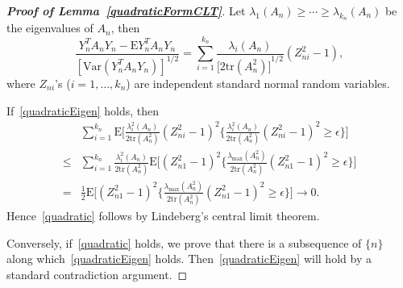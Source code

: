 \documentclass[review]{elsarticle}
\theoremstyle{plain}
\theoremstyle{definition}
\theoremstyle{remark}
\begin{document}
\begin{proof}[\textbf{Proof of Lemma~\ref{quadraticFormCLT}}]
    Let $\lambda_1(A_n)\geq\cdots\geq \lambda_{k_n}(A_n)$ be the eigenvalues of $A_n$, then 
    \begin{equation}
        \frac{Y_n^T A_n Y_n-\mathrm{E} Y_n^T A_n Y_n}{{[\mathrm{Var}(Y_n^T A_n Y_n)]}^{1/2}}=\sum_{i=1}^{k_n}\frac{\lambda_i(A_n)}{{\big[2\mathrm{tr}(A_n^2)\big]}^{1/2}}(Z_{ni}^2-1),
    \end{equation}
    where $Z_{ni}$'s ($i=1,\ldots,k_n$) are independent standard normal random variables.

    If~\ref{quadraticEigen} holds, then
    \begin{equation*}
        \begin{aligned}
            &\sum_{i=1}^{k_n}\mathrm{E}\Big[\frac{\lambda_i^2(A_n)}{2\mathrm{tr}(A_n^2)}{(Z_{ni}^2-1)}^2\Big\{\frac{\lambda_i^2(A_n)}{2\mathrm{tr}(A_n^2)}{(Z_{ni}^2-1)}^2\geq \epsilon\Big\}\Big]\\
            \leq&\sum_{i=1}^{k_n}
            \frac{\lambda_i^2(A_n)}{2\mathrm{tr}(A_n^2)}
            \mathrm{E}\Big[{(Z_{n1}^2-1)}^2\Big\{\frac{\lambda_{\max}(A_n^2)}{2\mathrm{tr}(A_n^2)}{(Z_{n1}^2-1)}^2\geq \epsilon\Big\}\Big]\\
            =&
            \frac{1}{2}\mathrm{E}\Big[{(Z_{n1}^2-1)}^2\Big\{\frac{\lambda_{\max}(A_n^2)}{2\mathrm{tr}(A_n^2)}{(Z_{n1}^2-1)}^2\geq \epsilon\Big\}\Big]\to 0.
        \end{aligned}
    \end{equation*}
    Hence~\ref{quadratic} follows by Lindeberg's central limit theorem.

    Conversely, if~\ref{quadratic} holds, we prove that there is a subsequence of $\{n\}$ along which~\ref{quadraticEigen} holds. Then~\ref{quadraticEigen} will hold by a standard contradiction argument. 


\end{proof}
\end{document}
